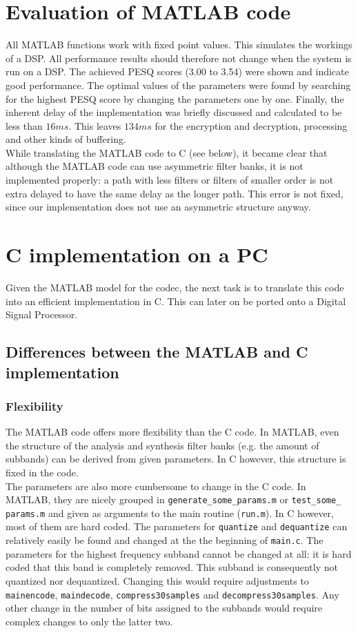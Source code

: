 \documentclass[a4paper]{article}
\begin{document}
\section{Evaluation of MATLAB code}
All MATLAB functions work with fixed point values. This simulates the workings of a DSP. All performance results should therefore not change when the system is run on a DSP. The achieved PESQ scores (3.00 to 3.54) were shown and indicate good performance. The optimal values of the parameters were found by searching for the highest PESQ score by changing the parameters one by one. Finally, the inherent delay of the implementation was briefly discussed and calculated to be less than $16ms$. This leaves $134ms$ for the encryption and decryption, processing and other kinds of buffering.\\

While translating the MATLAB code to C (see below), it became clear that although the MATLAB code can use asymmetric filter banks, it is not implemented properly: a path with less filters or filters of smaller order is not extra delayed to have the same delay as the longer path. This error is not fixed, since our implementation does not use an asymmetric structure anyway.

\section{C implementation on a PC}
Given the MATLAB model for the codec, the next task is to translate this code into an efficient implementation in C. This can later on be ported onto a Digital Signal Processor.
\subsection{Differences between the MATLAB and C implementation}\label{sec:differences}
\subsubsection{Flexibility}
The MATLAB code offers more flexibility than the C code. In MATLAB, even the structure of the analysis and synthesis filter banks (e.g. the amount of subbands) can be derived from given parameters. In C however, this structure is fixed in the code.\\

The parameters are also more cumbersome to change in the C code. In MATLAB, they are nicely grouped in \texttt{generate\_some\_params.m} or \texttt{test\_some\_ params.m} and given as arguments to the main routine (\texttt{run.m}). In C however, most of them are hard coded. The parameters for \texttt{quantize} and \texttt{dequantize} can relatively easily be found and changed at the the beginning of \texttt{main.c}. The parameters for the highest frequency subband cannot be changed at all: it is hard coded that this band is completely removed. This subband is consequently not quantized nor dequantized. Changing this would require adjustments to \texttt{mainencode}, \texttt{maindecode}, \texttt{compress30samples} and \texttt{decompress30samples}. Any other change in the number of bits assigned to the subbands would require complex changes to only the latter two.\\
\end{document}
